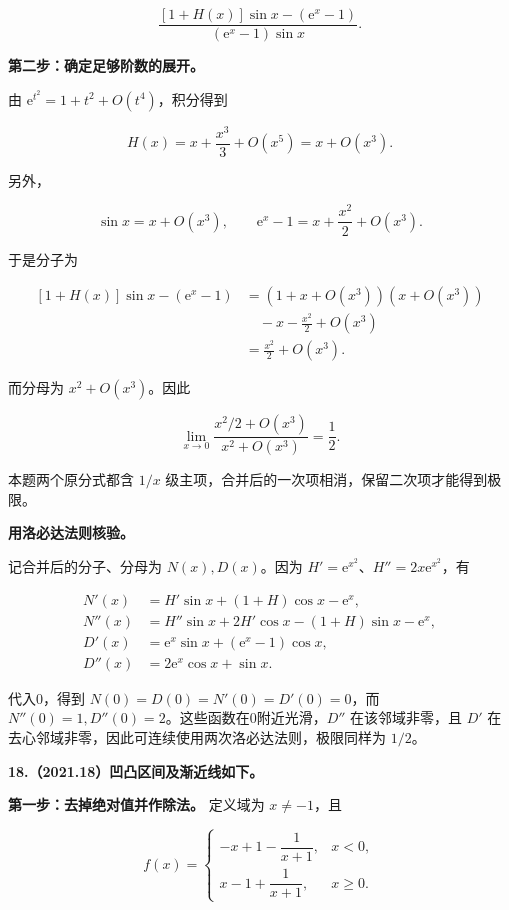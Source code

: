 \documentclass[UTF8,11pt,fontset=windows]{ctexart}
\begin{document}
$$
\frac{[1+H(x)]\sin x-(\mathrm e^x-1)}{(\mathrm e^x-1)\sin x}.
$$

\textbf{第二步：确定足够阶数的展开。}

由 $\mathrm e^{t^2}=1+t^2+O(t^4)$，积分得到

$$
H(x)=x+\frac{x^3}{3}+O(x^5)=x+O(x^3).
$$

另外，

$$
\sin x=x+O(x^3),\qquad
\mathrm e^x-1=x+\frac{x^2}{2}+O(x^3).
$$

于是分子为

$$
\begin{aligned}
[1+H(x)]\sin x-(\mathrm e^x-1)
&=(1+x+O(x^3))(x+O(x^3))\\
&\quad-x-\frac{x^2}{2}+O(x^3)\\
&=\frac{x^2}{2}+O(x^3).
\end{aligned}
$$

而分母为 $x^2+O(x^3)$。因此

$$
\lim_{x\to0}\frac{x^2/2+O(x^3)}{x^2+O(x^3)}=\frac12.
$$

本题两个原分式都含 $1/x$ 级主项，合并后的一次项相消，保留二次项才能得到极限。

\textbf{用洛必达法则核验。}

记合并后的分子、分母为 $N(x),D(x)$。因为 $H'=\mathrm e^{x^2}$、$H''=2x\mathrm e^{x^2}$，有

$$
\begin{aligned}
N'(x)&=H'\sin x+(1+H)\cos x-\mathrm e^x,\\
N''(x)&=H''\sin x+2H'\cos x-(1+H)\sin x-\mathrm e^x,\\
D'(x)&=\mathrm e^x\sin x+(\mathrm e^x-1)\cos x,\\
D''(x)&=2\mathrm e^x\cos x+\sin x.
\end{aligned}
$$

代入0，得到 $N(0)=D(0)=N'(0)=D'(0)=0$，而 $N''(0)=1,D''(0)=2$。这些函数在0附近光滑，$D''$ 在该邻域非零，且 $D'$ 在去心邻域非零，因此可连续使用两次洛必达法则，极限同样为 $1/2$。

\clearpage

\textbf{18.（2021.18）凹凸区间及渐近线如下。}

\textbf{第一步：去掉绝对值并作除法。} 定义域为 $x\ne-1$，且

$$
f(x)=\begin{cases}
-x+1-\dfrac1{x+1},&x<0,\\[4pt]
x-1+\dfrac1{x+1},&x\ge0.
\end{cases}
$$
\end{document}
